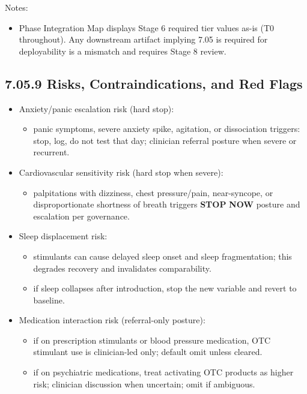 \documentclass[10pt]{article}
\begin{document}
\endgroup

Notes:

\begin{itemize}
\item Phase Integration Map displays Stage 6 required tier values as-is (T0 throughout). Any downstream artifact implying 7.05 is required for deployability is a mismatch and requires Stage 8 review.
\end{itemize}

\subsection*{7.05.9 Risks, Contraindications, and Red Flags}
{}

\begin{itemize}
\item Anxiety/panic escalation risk (hard stop):
  \begin{itemize}
  \item panic symptoms, severe anxiety spike, agitation, or dissociation triggers: stop, log, do not test that day; clinician referral posture when severe or recurrent.
  \end{itemize}
\item Cardiovascular sensitivity risk (hard stop when severe):
  \begin{itemize}
  \item palpitations with dizziness, chest pressure/pain, near-syncope, or disproportionate shortness of breath triggers \textbf{STOP} \textbf{NOW} posture and escalation per governance.
  \end{itemize}
\item Sleep displacement risk:
  \begin{itemize}
  \item stimulants can cause delayed sleep onset and sleep fragmentation; this degrades recovery and invalidates comparability.
  \item if sleep collapses after introduction, stop the new variable and revert to baseline.
  \end{itemize}
\item Medication interaction risk (referral-only posture):
  \begin{itemize}
  \item if on prescription stimulants or blood pressure medication, OTC stimulant use is clinician-led only; default omit unless cleared.
  \item if on psychiatric medications, treat activating OTC products as higher risk; clinician discussion when uncertain; omit if ambiguous.

\end{itemize}
\end{itemize}
\end{document}
